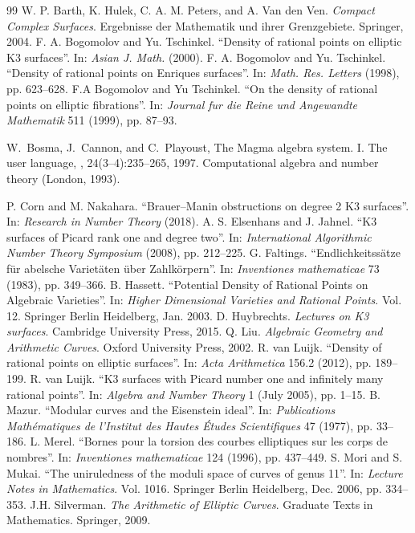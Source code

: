 \documentclass[11pt]{amsart}
\theoremstyle{plain}
\theoremstyle{remark}
\begin{document}
 
\begin{thebibliography}{99}
{}
W. P. Barth, K. Hulek, C. A. M. Peters, and A. Van den Ven. \emph{Compact
Complex Surfaces}. Ergebnisse der Mathematik und ihrer Grenzgebiete. Springer, 2004.
{}
F. A. Bogomolov and Yu. Tschinkel. “Density of rational points on elliptic K3 surfaces”.
In: \emph{Asian J. Math.} (2000).
{}
F. A. Bogomolov and Yu. Tschinkel. “Density of rational points on Enriques surfaces”.
In: \emph{Math. Res. Letters} (1998), pp. 623–628.
{}
F.A Bogomolov and Yu Tschinkel. “On the density of rational points on elliptic
fibrations”. In: \emph{Journal fur die Reine und Angewandte Mathematik} 511 (1999),
pp. 87–93.
{}

W.~Bosma, J.~Cannon, and C.~Playoust,
\newblock The Magma algebra system. I. The user language,
, 24(3--4):235--265, 1997.
\newblock Computational algebra and number theory (London, 1993).

P. Corn and M. Nakahara. “Brauer–Manin obstructions on degree 2 K3 surfaces”. In:
\emph{Research in Number Theory} (2018).
{}
A. S. Elsenhans and J. Jahnel. “K3 surfaces of Picard rank one and degree two”. In:
\emph{International Algorithmic Number Theory Symposium} (2008), pp. 212–225.
{}
G. Faltings. “Endlichkeitssätze für abelsche Varietäten über Zahlkörpern”. In:
\emph{Inventiones mathematicae} 73 (1983), pp. 349–366.
{}
B. Hassett. “Potential Density of Rational Points on Algebraic Varieties”. In:
\emph{Higher Dimensional Varieties and Rational Points}. Vol. 12. Springer Berlin
Heidelberg, Jan. 2003.
{}
D. Huybrechts. \emph{Lectures on K3 surfaces}. Cambridge University Press, 2015.
{}
Q. Liu. \emph{Algebraic Geometry and Arithmetic Curves}. Oxford University Press,
2002.
{}
R. van Luijk. “Density of rational points on elliptic surfaces”. In: \emph{Acta
Arithmetica} 156.2 (2012), pp. 189–199.
{}
R. van Luijk. “K3 surfaces with Picard number one and infinitely many rational
points”. In: \emph{Algebra and Number Theory} 1 (July 2005), pp. 1–15.
{}
B. Mazur. “Modular curves and the Eisenstein ideal”. In: \emph{Publications
Mathématiques de l’Institut des Hautes Études Scientifiques} 47 (1977), pp. 33–186.
{}
L. Merel. “Bornes pour la torsion des courbes elliptiques sur les corps de nombres”. In:
\emph{Inventiones mathematicae} 124 (1996), pp. 437–449.
{}
S. Mori and S. Mukai. “The uniruledness of the moduli space of curves of genus 11”. In:
\emph{Lecture Notes in Mathematics}. Vol. 1016. Springer Berlin Heidelberg, Dec. 2006,
pp. 334–353.
{}
J.H. Silverman. \emph{The Arithmetic of Elliptic Curves}. Graduate Texts in
Mathematics. Springer, 2009.
\end{thebibliography}
\end{document}
